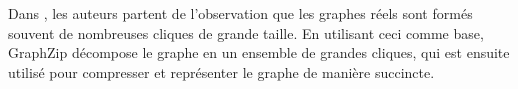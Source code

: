 		Dans \citep{rossi2018graphzip}, les auteurs partent de l'observation que les graphes réels sont formés souvent de nombreuses cliques de grande taille. En utilisant ceci comme base, GraphZip décompose le graphe en un ensemble de grandes cliques, qui est ensuite utilisé pour compresser et représenter le graphe de manière succincte. 